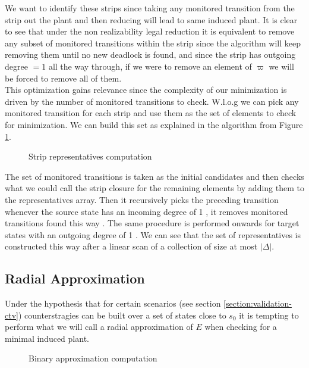 We want to identify these strips since taking any monitored transition
from the strip out the plant and then reducing will lead to same
induced plant.  It is clear to see that under the non realizability
legal reduction it is equivalent to remove any subset of monitored transitions
within the strip since the algorithm will keep removing them until
no new deadlock is found, and since the strip has outgoing degree $=1$
all the way through, if we were to remove an element of $\varpi$ we will
be forced to remove all of them.\\
This optimization gains relevance since the complexity of our minimization
is driven by the number of monitored transitions to check.
W.l.o.g we can pick any monitored transition for each strip and use them
as the set of elements to check for minimization.
We can build this set as explained in the algorithm from Figure
\ref{fig:strip-code}.
\begin{figure}[ht]
  \begin{center}
     
    \caption{Strip representatives computation}
    \label{fig:strip-code}
  \end{center}
\end{figure}
The set of monitored transitions is taken as the initial candidates
 and then checks what we could call the strip closure
for the remaining elements  by adding them to the representatives
array. Then it recursively picks the preceding transition whenever
the source state has an incoming degree of 1 , it removes
monitored transitions found this way .  The same procedure
is performed onwards for target states with an outgoing degree of 1
. We can see that the set of representatives is constructed 
this way after a linear scan of a collection of size at most $|\Delta|$.

\subsection{Radial Approximation}
Under the hypothesis that for certain scenarios (see section
\ref{section:validation-ctv}) counterstragies
 can be built over a set of states close to $s_0$ it is tempting
 to perform what we will call a radial approximation 
 of $E$ when checking for a minimal induced plant.

\begin{figure}[ht]
  \begin{center}
     
    \caption{Binary approximation computation}
    \label{fig:kapprox-code}
  \end{center}
\end{figure}

